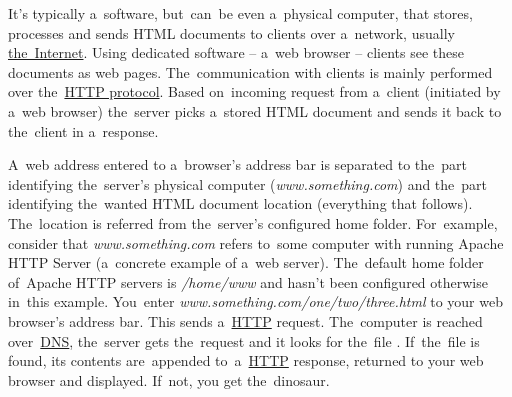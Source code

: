 \label{webserver}
It's typically a~software, but~can~be even a~physical computer, that stores, processes and sends HTML documents to clients over a~network, usually \hyperref[internetweb]{the~Internet}.
Using dedicated software -- a~web browser -- clients see these documents as web pages.
The~communication with clients is mainly performed over the~\hyperref[http]{HTTP protocol}.
Based on~incoming request from a~client (initiated by a~web browser) the~server picks a~stored HTML document and sends it back to the~client in a~response.

A~web address entered to a~browser's address bar is separated to the~part identifying the~server's physical computer (\textit{www.something.com}) and the~part identifying the~wanted HTML document location (everything that follows).
The~location is referred from the~server's configured home folder.
For~example, consider that \textit{www.something.com} refers to~some computer with running Apache HTTP Server (a~concrete example of a~web server).
The~default home folder of~Apache HTTP servers is \textit{/home/www} and hasn't been configured otherwise in~this example.
You~enter \textit{www.something.com/one/two/three.html} to your web browser's address bar.
This sends a~\hyperref[http]{HTTP} request.
The~computer is reached over~\hyperref[dns]{DNS}, the~server gets the~request and it looks for the~file .
If~the~file is found, its contents are~appended to~a~\hyperref[http]{HTTP} response, returned to your web browser and displayed.
If~not, you get the~dinosaur.
